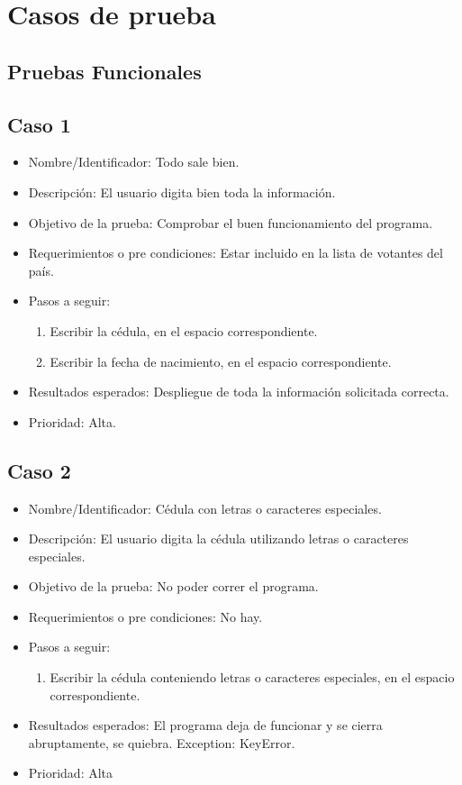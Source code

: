 \documentclass[conference]{IEEEtran}
\begin{document}
\section{Casos de prueba}
\subsection{Pruebas Funcionales}
\subsection*{Caso 1}
\begin{itemize}
\item Nombre/Identificador: Todo sale bien.
\item Descripción: El usuario digita bien toda la información.
\item Objetivo de la prueba: Comprobar el buen funcionamiento del programa.
\item Requerimientos o pre condiciones: Estar incluido en la lista de votantes del país.
\item Pasos a seguir: 
\begin{enumerate}
\item Escribir la cédula, en el espacio correspondiente.
\item Escribir la fecha de nacimiento, en el espacio correspondiente.
\end{enumerate}
\item Resultados esperados: Despliegue de toda la información solicitada correcta.
\item Prioridad: Alta.
\end{itemize}
\subsection*{Caso 2}
\begin{itemize}
\item Nombre/Identificador: Cédula con letras o caracteres especiales.
\item Descripción: El usuario digita la cédula utilizando letras o caracteres especiales.
\item Objetivo de la prueba: No poder correr el programa.
\item Requerimientos o pre condiciones: No hay.
\item Pasos a seguir: 
\begin{enumerate}
\item Escribir la cédula conteniendo letras o caracteres especiales, en el espacio correspondiente.
\end{enumerate}
\item Resultados esperados: El programa deja de funcionar y se cierra abruptamente, se quiebra. Exception: KeyError.
\item Prioridad: Alta
\end{itemize}
\end{document}
